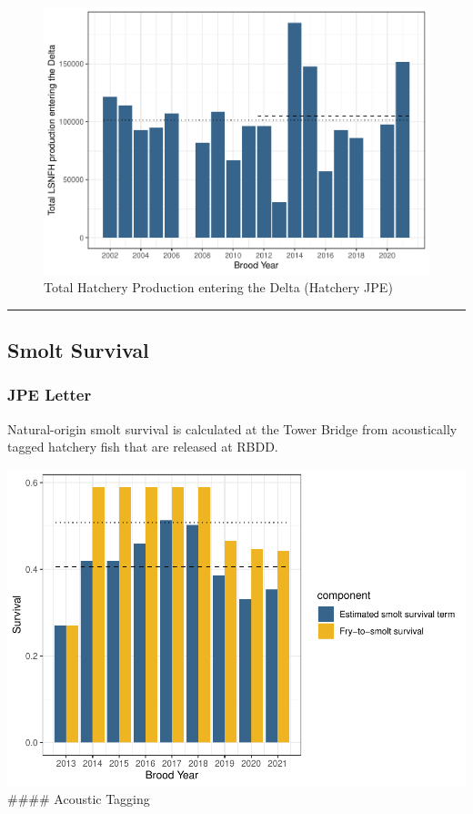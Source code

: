 \documentclass[
]{book}
\theoremstyle{definition}
\theoremstyle{definition}
\theoremstyle{definition}
\theoremstyle{definition}
\theoremstyle{remark}
\begin{document}
\begin{figure}
\centering
\includegraphics{_main_files/figure-latex/jpeH-fig-1.pdf}
\caption{\label{fig:jpeH-fig}Total Hatchery Production entering the Delta (Hatchery JPE)}
\end{figure}

\begin{center}\rule{0.5\linewidth}{0.5pt}\end{center}

\hypertarget{smolt-survival}{%
\subsection{Smolt Survival}\label{smolt-survival}}

\hypertarget{jpe-letter}{%
\subsubsection{JPE Letter}\label{jpe-letter}}

Natural-origin smolt survival is calculated at the Tower Bridge from acoustically tagged hatchery fish that are released at RBDD.

\includegraphics{_main_files/figure-latex/smoltsurvival-fig-1.pdf}
\#\#\#\# Acoustic Tagging
\end{document}

